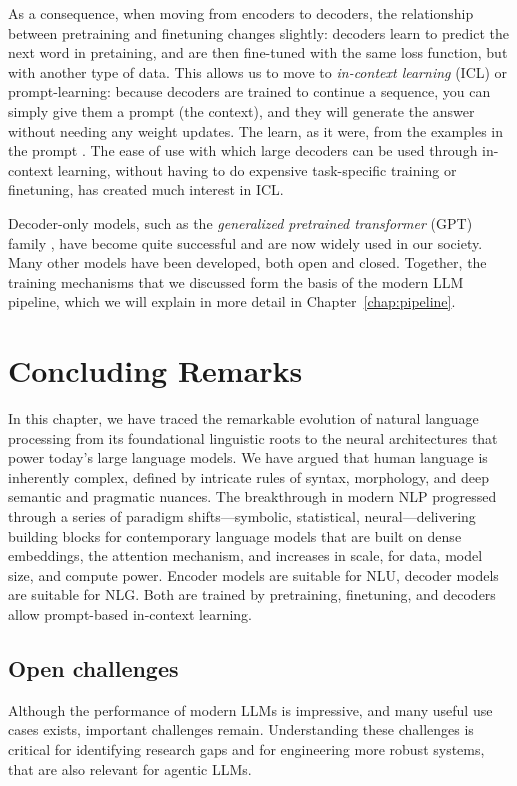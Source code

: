 As a consequence, when moving from encoders to decoders, the relationship between pretraining and finetuning changes slightly: decoders learn to predict the next word in pretaining, and are then fine-tuned with the same loss function, but with another type of data. This allows us to move to {\em in-context learning} (ICL) or prompt-learning: because decoders are trained to continue a sequence, you can simply give them a prompt (the context), and they will generate the answer without needing any weight updates. The learn, as it were, from the examples in the prompt \citep{brown2020language}. The ease of use with which large decoders can be used through in-context learning, without having to do expensive task-specific training or finetuning,  has created much interest in ICL. 

Decoder-only models, such as the {\em generalized pretrained transformer} (GPT) family \citep{radford2018improving,radford2019language,brown2020language,ouyang2022training,achiam2023gpt},  have become quite successful and are now widely used in our society. Many other models have been developed, both open and closed. 
%
Together, the training mechanisms that we discussed form the basis of the modern LLM pipeline, which we will explain in more detail in Chapter~\ref{chap:pipeline}.



\section{Concluding Remarks}
In this chapter, we have traced the remarkable evolution of natural language processing from its foundational linguistic roots to the neural architectures that power today's large language models. We have argued that  human language is inherently complex, defined by intricate rules of syntax, morphology, and deep semantic and pragmatic nuances. The breakthrough in modern NLP progressed through  a series of  paradigm shifts---symbolic, statistical, neural---delivering  building blocks for contemporary language models that are built on  dense embeddings, the attention mechanism, and increases in scale, for data, model size, and compute power. Encoder models are suitable for NLU, decoder models are suitable for NLG. Both are trained by pretraining, finetuning, and decoders allow prompt-based  in-context learning.  %

\subsection{Open challenges}
Although the performance of modern LLMs is  impressive, and many useful use cases exists, important challenges remain. %
Understanding these challenges is critical for identifying research gaps and for engineering more robust systems,  that are also relevant for agentic LLMs. 

